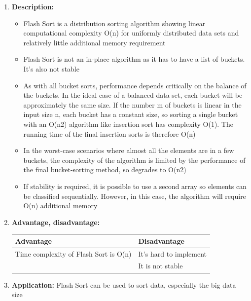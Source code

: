 \documentclass[11pt,a4paper]{article}
\begin{document}
{\begin{enumerate}[label=\textbf{\arabic*})]
				\item \textbf{Description:}
					\begin{itemize}
						\item Flash Sort is a distribution sorting algorithm showing linear computational complexity O(n) for uniformly distributed data sets and relatively little additional memory requirement
						\item Flash Sort is not an in-place algorithm as it has to have a list of buckets. It’s also not stable
						\item As with all bucket sorts, performance depends critically on the balance of the buckets. In the ideal case of a balanced data set, each bucket will be approximately the same size. If the number m of buckets is linear in the input size n, each bucket has a constant size, so sorting a single bucket with an O(n2) algorithm like insertion sort has complexity O(1). The running time of the final insertion sorts is therefore O(n)
						\item In the worst-case scenarios where almost all the elements are in a few buckets, the complexity of the algorithm is limited by the performance of the final bucket-sorting method, so degrades to O(n2)
						\item If stability is required, it is possible to use a second array so elements can be classified sequentially. However, in this case, the algorithm will require O(n) additional memory
					\end{itemize}
				
				\item \textbf{Advantage, disadvantage:}
					\begin{table}[H]
						\centering
						\begin{tabular}{|p{8cm}|p{8cm}|}
							\hline
							\textbf{Advantage} & \textbf{Disadvantage} \\
							\hline
							\hline
							Time complexity of Flash Sort is O(n)  & It’s hard to implement \\[12pt]
							 & It is not stable\\
							\hline
						\end{tabular}
					\end{table}
				\item \textbf{Application:}	
					Flash Sort can be used to sort data, especially the big data size
			\end{enumerate}
	
	\pagebreak
}
\end{document}
